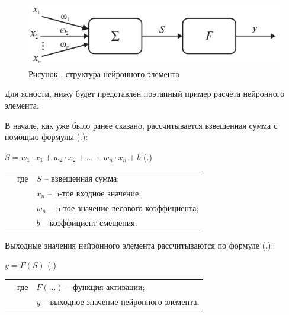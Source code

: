 {  \begin{figure}[H]
    \centering
    \def\svgwidth{\textwidth}
    \includegraphics[width=\textwidth]{images/Neuron.png}
    \caption*{\gostFont Рисунок \thechaptercntr .\theimagecntr \spc {--} структура нейронного элемента}
    \label{fig:Neuron}
  \end{figure} \addtocounter{imagecntr}{1}

  \par \redline Для ясности, нижу будет представлен поэтапный пример расчёта нейронного элемента.

  \par \redline В начале, как уже было ранее сказано, рассчитывается взвешенная сумма с помощью формулы (\thechaptercntr .\theformulacntr):

	\formulaspace
	\par \redline $S = w_1 \cdot x_1 + w_2 \cdot x_2 + \dots + w_n \cdot x_n + b$ \hfill (\thechaptercntr .\theformulacntr) \redline
	\formulaspace \addtocounter{formulacntr}{1}

  \begin{tabular}{p{}p{}p{}}
		& где  & $S$ {--} взвешенная сумма; \\
		& 	   & $x_n$ {--} n-тое входное значение; \\
    & 	   & $w_n$ {--} n-тое значение весового коэффициента; \\
    & 	   & $b$ {--} коэффициент смещения. \\
  \end{tabular}

  \par \redline Выходные значения нейронного элемента рассчитываются по формуле (\thechaptercntr .\theformulacntr):

	\formulaspace
	\par \redline $y = F \left(S\right)$ \hfill (\thechaptercntr .\theformulacntr) \redline
	\formulaspace \addtocounter{formulacntr}{1}

  \begin{tabular}{p{}p{}p{}}
		& где  & $F({...})$ {--} функция активации; \\
		& 	   & $y$ {--} выходное значение нейронного элемента. \\
  \end{tabular}

}
